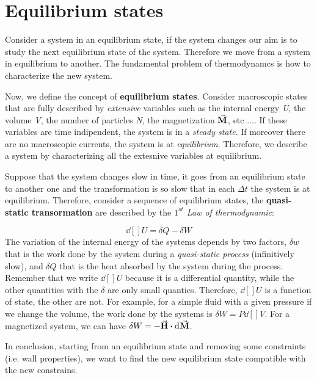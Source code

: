 \documentclass[../main/main.tex]{subfiles}
\begin{document}
\section{Equilibrium states}

Consider a system in an equilibrium state, if the system changes our aim is to study the next equilibrium state of the system. Therefore we move from a system in equilibrium to another. The fundamental problem of thermodynamcs is how to characterize the new system.

Now, we define the concept of \textbf{equilibrium states}. Consider macroscopic states that are fully described by \emph{extensive} variables such as the internal energy \emph{U}, the volume \emph{V}, the number of particles \emph{N}, the magnetization \( \va{M} \), etc \( \dots \).
If these variables are time indipendent, the system is in a \textit{steady state}.
If moreover there are no macroscopic currents, the system is at \textit{equilibrium}.
Therefore, we describe a system by characterizing all the extesnive variables at equilibrium.

Suppose that the system changes slow in time, it goes from an equilibrium state to another one and the transformation is so slow that in each $\Delta t$ the system is at equilibrium. Therefore, consider a sequence of equilibrium states, the \textbf{quasi-static transormation} are described by the  \textit{\( 1^{st} \) Law of thermodynamic}:

\begin{equation}
  \dd[]{U} = \delta Q - \delta W
  \label{eq:}
\end{equation}
The variation of the internal energy of the systems depends by two factors, \( \delta w \) that is the work done by the system during a \emph{quasi-static process} (infinitively slow), and \( \delta Q \) that is the heat absorbed by the system during the process. Remember that we write \( \dd[]{U}  \) because it is a differential quantity, while the other quantities with the \( \delta  \) are only small quanties. Therefore, \( \dd[]{U}  \) is a function of state, the other are not.
For example, for a simple fluid with a given pressure if we change the volume, the work done by the systems is \( \delta W = P \dd[]{V}  \). For a magnetized system, we can have \( \delta W = -\va{H} \vdot  \dd[]{\va{M} }  \).

In conclusion, starting from an equilibrium state and removing some constraints (i.e. wall properties), we want to find the new equilibrium state compatible with the new constrains.
\end{document}
